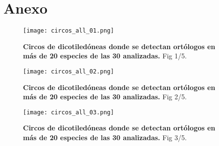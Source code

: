 \setcounter{chapter}{9}
\chapter*{Anexo} 
\setcounter{figure}{0}
\setcounter{table}{0}
\setcounter{section}{0}

\graphicspath{{Appendix/Figs/}}







\setlength{\oddsidemargin}{-1cm}

\begin{landscape}
    \begin{figure}[htbp!] 
        \centering    
        \texttt{[image: circos\_all\_01.png]}
        \caption[Circos de dicotiledóneas (en más de 20 especies). 1/5]{
        \textbf{Circos de dicotiledóneas donde se detectan ortólogos en más de 20 especies de las 30 analizadas.}
        Fig 1/5.
        }
        \label{fig:circos_all_01}
    \end{figure}
\end{landscape}

\begin{landscape}
    \begin{figure}[htbp!] 
        \centering    
        \texttt{[image: circos\_all\_02.png]}
        \caption[Circos de dicotiledóneas (en más de 20 especies). 2/5]{
        \textbf{Circos de dicotiledóneas donde se detectan ortólogos en más de 20 especies de las 30 analizadas.}
        Fig 2/5.
        }
        \label{fig:circos_all_02}
    \end{figure}
\end{landscape}

\begin{landscape}
    \begin{figure}[htbp!] 
        \centering    
        \texttt{[image: circos\_all\_03.png]}
        \caption[Circos de dicotiledóneas (en más de 20 especies). 3/5]{
        \textbf{Circos de dicotiledóneas donde se detectan ortólogos en más de 20 especies de las 30 analizadas.}
        Fig 3/5.
        }
        \label{fig:circos_all_03}
    \end{figure}
\end{landscape}

